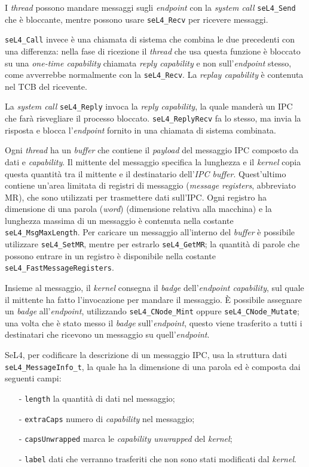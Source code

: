 I \textit{thread} possono mandare messaggi sugli \textit{endpoint} con la \textit{system call} \texttt{seL4\_Send} che è bloccante, mentre possono usare \texttt{seL4\_Recv} per ricevere messaggi.

\texttt{seL4\_Call} invece è una chiamata di sistema che combina le due precedenti con una differenza: nella fase di ricezione il \textit{thread} che usa questa funzione è bloccato su una \textit{one-time capability} chiamata \textit{reply capability} e non sull'\textit{endpoint} stesso, come avverrebbe normalmente con la \texttt{seL4\_Recv}. La \textit{replay capability} è contenuta nel TCB del ricevente.

La \textit{system call} \texttt{seL4\_Reply} invoca la \textit{reply capability}, la quale manderà un IPC che farà risvegliare il processo bloccato. \texttt{seL4\_ReplyRecv} fa lo stesso, ma invia la risposta e blocca l'\textit{endpoint} fornito in una chiamata di sistema combinata.

Ogni \textit{thread} ha un \textit{buffer} che contiene il \textit{payload} del messaggio IPC composto da dati e \textit{capability}. Il mittente del messaggio specifica la lunghezza e il \textit{kernel} copia questa quantità tra il mittente e il destinatario dell'\textit{IPC buffer}. Quest'ultimo contiene un'area limitata di registri di messaggio (\textit{message registers}, abbreviato MR), che sono utilizzati per trasmettere dati sull'IPC. Ogni registro ha dimensione di una parola (\textit{word}) (dimensione relativa alla macchina) e la lunghezza massima di un messaggio è contenuta nella costante \texttt{seL4\_MsgMaxLength}. Per caricare un messaggio all'interno del \textit{buffer} è possibile utilizzare \texttt{seL4\_SetMR}, mentre per estrarlo \texttt{seL4\_GetMR}; la quantità di parole che possono entrare in un registro è disponibile nella costante \texttt{seL4\_FastMessageRegisters}.

Insieme al messaggio, il \textit{kernel} consegna il \textit{badge} dell'\textit{endpoint capability}, sul quale il mittente ha fatto l'invocazione per mandare il messaggio. È possibile assegnare un \textit{badge} all'\textit{endpoint}, utilizzando \texttt{seL4\_CNode\_Mint} oppure \texttt{seL4\_CNode\_Mutate}; una volta che è stato messo il \textit{badge} sull'\textit{endpoint}, questo viene trasferito a tutti i destinatari che ricevono un messaggio su quell'\textit{endpoint}.

SeL4, per codificare la descrizione di un messaggio IPC, usa la struttura dati \texttt{seL4\_MessageInfo\_t}, la quale ha la dimensione di una parola ed è composta dai seguenti campi: 
\begin{itemize}
	\item[-] \texttt{length} la quantità di dati nel messaggio;
	\item[-] \texttt{extraCaps} numero di \textit{capability} nel messaggio;
	\item[-] \texttt{capsUnwrapped} marca le \textit{capability unwrapped} del \textit{kernel};
	\item[-] \texttt{label} dati che verranno trasferiti che non sono stati modificati dal \textit{kernel}.
\end{itemize}

